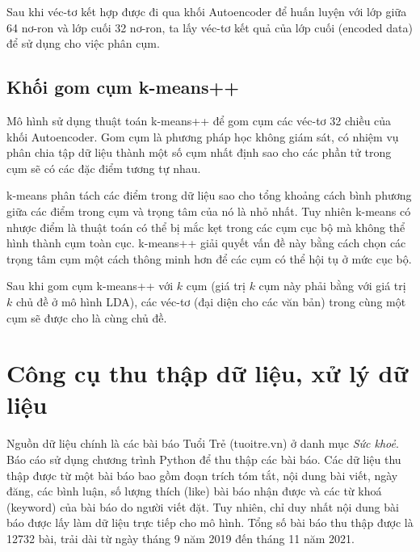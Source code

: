 
Sau khi véc-tơ kết hợp được đi qua khối Autoencoder để huấn luyện với lớp giữa 64 nơ-ron và lớp cuối 32 nơ-ron, ta lấy véc-tơ kết quả của lớp cuối (encoded data) để sử dụng cho việc phân cụm.

\subsection{Khối gom cụm k-means++}
Mô hình sử dụng thuật toán k-means++ để gom cụm các véc-tơ 32 chiều của khối Autoencoder. Gom cụm là phương pháp học không giám sát, có nhiệm vụ phân chia tập dữ liệu thành một số cụm nhất định sao cho các phần tử trong cụm sẽ có các đặc điểm tương tự nhau.

k-means phân tách các điểm trong dữ liệu sao cho tổng khoảng cách bình phương giữa các điểm trong cụm và trọng tâm của nó là nhỏ nhất. Tuy nhiên k-means có nhược điểm là thuật toán có thể bị mắc kẹt trong các cụm cục bộ mà không thể hình thành cụm toàn cục. k-means++ giải quyết vấn đề này bằng cách chọn các trọng tâm cụm một cách thông minh hơn để các cụm có thể hội tụ ở mức cục bộ.

Sau khi gom cụm k-means++ với $k$ cụm (giá trị $k$ cụm này phải bằng với giá trị $k$ chủ đề ở mô hình LDA), các véc-tơ (đại diện cho các văn bản) trong cùng một cụm sẽ được cho là cùng chủ đề.

\section{Công cụ thu thập dữ liệu, xử lý dữ liệu}

Nguồn dữ liệu chính là các bài báo Tuổi Trẻ (tuoitre.vn) ở danh mục \textit{Sức khoẻ}. Báo cáo sử dụng chương trình Python để thu thập các bài báo. Các dữ liệu thu thập được từ một bài báo bao gồm đoạn trích tóm tắt, nội dung bài viết, ngày đăng, các bình luận, số lượng thích (like) bài báo nhận được và các từ khoá (keyword) của bài báo do người viết đặt. Tuy nhiên, chỉ duy nhất nội dung bài báo được lấy làm dữ liệu trực tiếp cho mô hình. Tổng số bài báo thu thập được là 12732 bài, trải dài từ ngày tháng 9 năm 2019 đến tháng 11 năm 2021.

